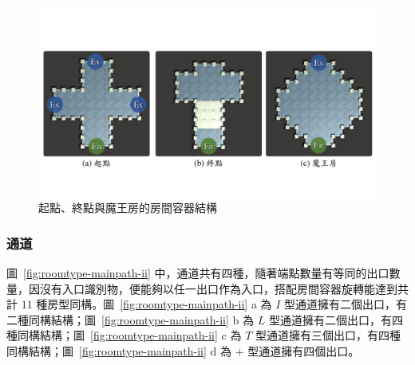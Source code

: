 \begin{figure}[!htb]
  \begin{center}
    \includegraphics[width=1.0\textwidth]{figures/roomtype-mainpath-i.pdf}
    \caption{起點、終點與魔王房的房間容器結構}
    \label{fig:roomtype-mainpath-i}
  \end{center}
\end{figure}

\subsubsection{通道}
\label{sssec:method-spacepieces-types-path}

圖~\ref{fig:roomtype-mainpath-ii} 中，通道共有四種，隨著端點數量有等同的出口數量，因沒有入口識別物，便能夠以任一出口作為入口，搭配房間容器旋轉能達到共計 $11$ 種房型同構。圖~\ref{fig:roomtype-mainpath-ii} a 為 $I$ 型通道擁有二個出口，有二種同構結構；圖~\ref{fig:roomtype-mainpath-ii} b 為 $L$ 型通道擁有二個出口，有四種同構結構；圖~\ref{fig:roomtype-mainpath-ii} c 為 $T$ 型通道擁有三個出口，有四種同構結構；圖~\ref{fig:roomtype-mainpath-ii} d 為 $+$ 型通道擁有四個出口。


